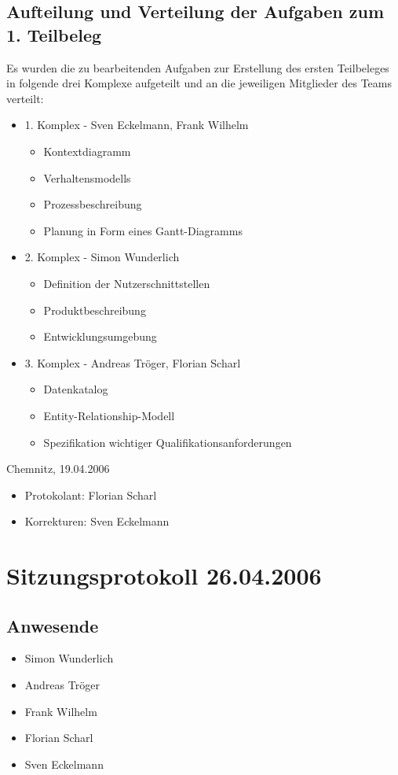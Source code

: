 			\subsection{Aufteilung und Verteilung der Aufgaben zum 1. Teilbeleg}
			Es wurden die zu bearbeitenden Aufgaben zur Erstellung des ersten Teilbeleges in folgende drei Komplexe aufgeteilt und an die jeweiligen Mitglieder des Teams verteilt:
			\begin{itemize}
				\item 1. Komplex - Sven Eckelmann, Frank Wilhelm
					\begin{itemize}	
						\item Kontextdiagramm
						\item Verhaltensmodells
						\item Prozessbeschreibung
						\item Planung in Form eines Gantt-Diagramms
					\end{itemize}
				\item 2. Komplex - Simon Wunderlich
					\begin{itemize}
						\item Definition der Nutzerschnittstellen
						\item Produktbeschreibung
						\item Entwicklungsumgebung
					\end{itemize}
				\item 3. Komplex - Andreas Tröger, Florian Scharl
					\begin{itemize}
						\item Datenkatalog
						\item Entity-Relationship-Modell
						\item Spezifikation wichtiger Qualifikationsanforderungen
					\end{itemize}
			\end{itemize}
			Chemnitz, 19.04.2006
			\begin{itemize}
				\item Protokolant: Florian Scharl
				\item Korrekturen: Sven Eckelmann
			\end{itemize}
\newpage
		\section{Sitzungsprotokoll 26.04.2006}
		\subsection{Anwesende}
		\begin{itemize}
			\item Simon Wunderlich
			\item Andreas Tröger
			\item Frank Wilhelm
			\item Florian Scharl
			\item Sven Eckelmann
		\end{itemize}
